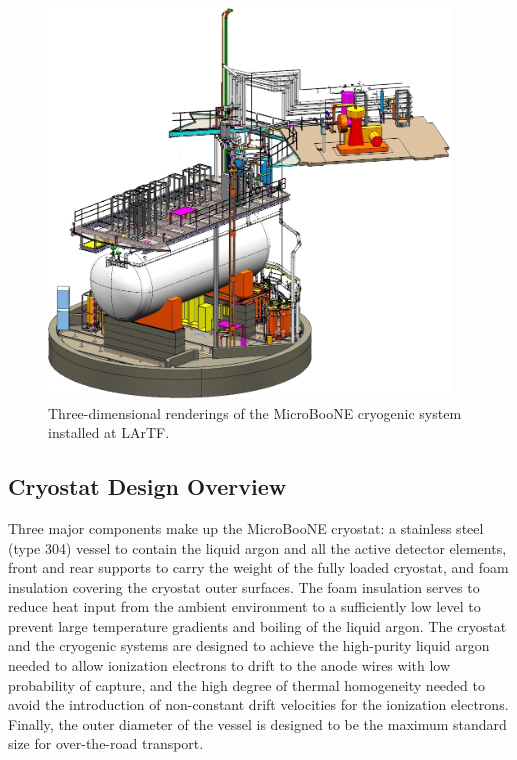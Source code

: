 \begin{figure}
\centering 
\includegraphics[width=0.95\textwidth]{figures/FULL-ASSY-1.jpg}
\caption{Three-dimensional renderings of the MicroBooNE cryogenic system installed at LArTF.}
\label{fig:cryogenics}
\end{figure}




\subsection{Cryostat Design Overview}

Three major components make up the MicroBooNE cryostat: a stainless steel (type 304) vessel to contain the liquid argon and all the active detector elements, front and rear supports to carry the weight of the fully loaded cryostat, and foam insulation covering the cryostat outer surfaces.  The foam insulation serves to reduce heat input from the ambient environment to a sufficiently low level to prevent large temperature gradients and boiling of the liquid argon. The cryostat and the cryogenic systems are designed to achieve the high-purity liquid argon needed to allow ionization electrons to drift to the anode wires with low probability of capture, and the high degree of thermal homogeneity needed to avoid the introduction of non-constant drift velocities for the ionization electrons. Finally, the outer diameter of the vessel is designed to be the maximum standard size for over-the-road transport.


